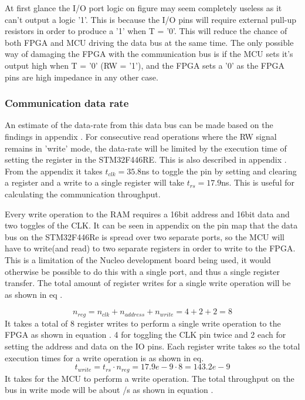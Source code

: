 At first glance the I/O port logic on figure  may seem completely useless as it can't output a logic '1'. This is because the I/O pins will require external pull-up resistors in order to produce a '1' when T = '0'. This will reduce the chance of both FPGA and MCU driving the data bus at the same time. The only possible way of damaging the FPGA with the communication bus is if the MCU sets it's output high when T = '0' (RW = '1'), and the FPGA sets a '0' as the FPGA pins are high impedance in any other case.

\subsubsection{Communication data rate} \label{subsubsec:CommunicationDatarate}

An estimate of the data-rate from this data bus can be made based on the findings in appendix . For consecutive read operations where the RW signal remains in 'write' mode, the data-rate will be limited by the execution time of setting the register in the STM32F446RE. This is also described in appendix . From the appendix it takes $t_{clk} = 35.8$ns to toggle the pin by setting and clearing a register and a write to a single register will take $t_{rs} = 17.9$ns. This is useful for calculating the communication throughput.

Every write operation to the RAM requires a 16bit address and 16bit data and two toggles of the CLK. It can be seen in appendix  on the pin map that the data bus on the STM32F446Re is spread over two separate ports, so the MCU will have to write(and read) to two separate registers in order to write to the FPGA. This is a limitation of the Nucleo development board being used, it would otherwise be possible to do this with a single port, and thus a single register transfer. The total amount of register writes for a single write operation will be as shown in eq .

\begin{equation}\label{eq:7_2_1_Write_ThroughPut}
    n_{reg} = n_{clk} +  n_{address} + n_{write} = 4+2+2 = 8 
\end{equation}
It takes a total of 8 register writes to perform a single write operation to the FPGA as shown in equation . 4 for toggling the CLK pin twice and 2 each for setting the address and data on the IO pins. Each register write takes  so the total execution times for a write operation is  as shown in eq.
\begin{equation}\label{eq:7_2_1_Write_ThroughPutTotalTime}
    t_{write} = t_{rs} \cdot n_{reg} = 17.9e-9 \cdot 8 =  143.2e-9
\end{equation}
It takes  for the MCU to perform a write operation. The total throughput on the bus in write mode will be about /s as shown in equation .


